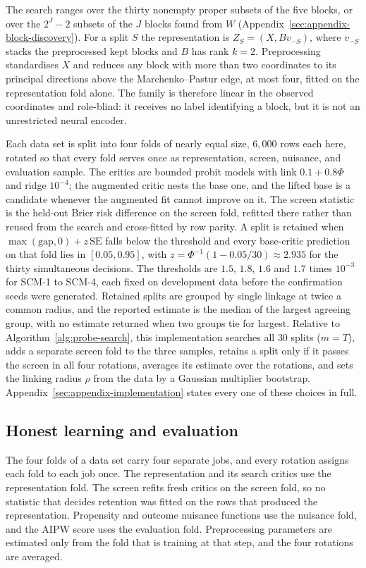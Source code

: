 The search ranges over the thirty nonempty proper subsets of the five blocks, or over the $2^J-2$ subsets of the $J$ blocks found from $W$ (Appendix~\ref{sec:appendix-block-discovery}). For a split $S$ the representation is $Z_S=(X,Bv_{-S})$, where $v_{-S}$ stacks the preprocessed kept blocks and $B$ has rank $k=2$. Preprocessing standardises $X$ and reduces any block with more than two coordinates to its principal directions above the Marchenko--Pastur edge, at most four, fitted on the representation fold alone. The family is therefore linear in the observed coordinates and role-blind: it receives no label identifying a block, but it is not an unrestricted neural encoder.

Each data set is split into four folds of nearly equal size, $6{,}000$ rows each here, rotated so that every fold serves once as representation, screen, nuisance, and evaluation sample. The critics are bounded probit models with link $0.1+0.8\Phi$ and ridge $10^{-4}$; the augmented critic nests the base one, and the lifted base is a candidate whenever the augmented fit cannot improve on it. The screen statistic is the held-out Brier risk difference on the screen fold, refitted there rather than reused from the search and cross-fitted by row parity. A split is retained when $\max(\mathrm{gap},0)+z\,\mathrm{SE}$ falls below the threshold and every base-critic prediction on that fold lies in $[0.05,0.95]$, with $z=\Phi^{-1}(1-0.05/30)\approx 2.935$ for the thirty simultaneous decisions. The thresholds are $1.5$, $1.8$, $1.6$ and $1.7$ times $10^{-3}$ for SCM-1 to SCM-4, each fixed on development data before the confirmation seeds were generated. Retained splits are grouped by single linkage at twice a common radius, and the reported estimate is the median of the largest agreeing group, with no estimate returned when two groups tie for largest. Relative to Algorithm~\ref{alg:probe-search}, this implementation searches all $30$ splits ($m=T$), adds a separate screen fold to the three samples, retains a split only if it passes the screen in all four rotations, averages its estimate over the rotations, and sets the linking radius $\rho$ from the data by a Gaussian multiplier bootstrap. Appendix~\ref{sec:appendix-implementation} states every one of these choices in full.

\subsection{Honest learning and evaluation}

The four folds of a data set carry four separate jobs, and every rotation assigns each fold to each job once. The representation and its search critics use the representation fold. The screen refits fresh critics on the screen fold, so no statistic that decides retention was fitted on the rows that produced the representation. Propensity and outcome nuisance functions use the nuisance fold, and the AIPW score uses the evaluation fold. Preprocessing parameters are estimated only from the fold that is training at that step, and the four rotations are averaged.

